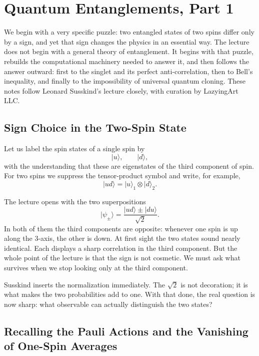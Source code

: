 \chapter{Quantum Entanglements, Part 1}

We begin with a very specific puzzle: two entangled states of two spins differ only by a sign, and yet that sign changes the physics in an essential way. The lecture does not begin with a general theory of entanglement. It begins with that puzzle, rebuilds the computational machinery needed to answer it, and then follows the answer outward: first to the singlet and its perfect anti-correlation, then to Bell's inequality, and finally to the impossibility of universal quantum cloning. These notes follow Leonard Susskind's lecture closely, with curation by LazyingArt LLC.

\section{Sign Choice in the Two-Spin State}

Let us label the spin states of a single spin by
\[
|u\rangle,\qquad |d\rangle,
\]
with the understanding that these are eigenstates of the third component of spin. For two spins we suppress the tensor-product symbol and write, for example,
\[
|ud\rangle = |u\rangle_1\otimes |d\rangle_2.
\]

The lecture opens with the two superpositions
\begin{equation}
|\psi_{\pm}\rangle
=
\frac{|ud\rangle \pm |du\rangle}{\sqrt{2}}.
\end{equation}
In both of them the third components are opposite: whenever one spin is up along the \(3\)-axis, the other is down. At first sight the two states sound nearly identical. Each displays a sharp correlation in the third component. But the whole point of the lecture is that the sign is not cosmetic. We must ask what survives when we stop looking only at the third component.

Susskind inserts the normalization immediately. The \(\sqrt{2}\) is not decoration; it is what makes the two probabilities add to one. With that done, the real question is now sharp: what observable can actually distinguish the two states?

\section{Recalling the Pauli Actions and the Vanishing of One-Spin Averages}

